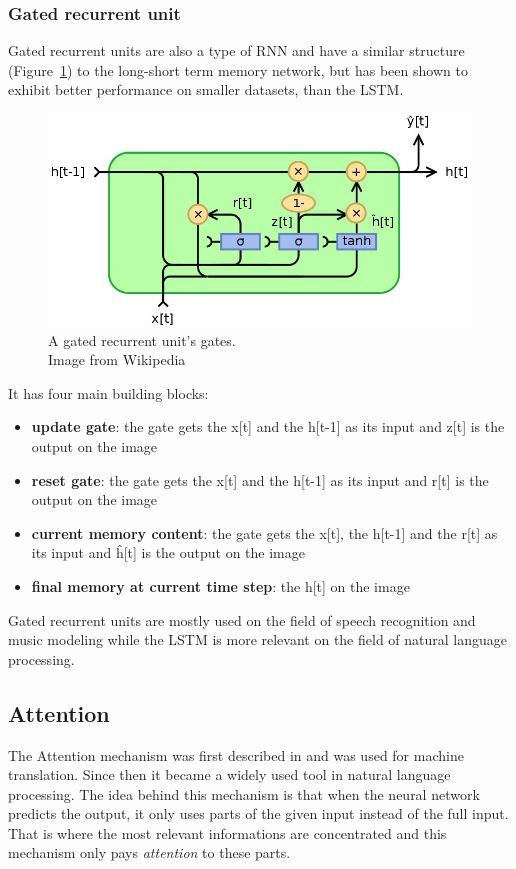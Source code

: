\subsubsection{Gated recurrent unit}
Gated recurrent units are also a type of RNN and have a similar structure (Figure~\ref{fig:gru}) to the long-short term memory network, but has been shown to exhibit better performance on smaller datasets, than the LSTM.
\begin{figure}[!htb]
	\centering
	\includegraphics[scale=0.5]{gru.jpg}
	\caption{A gated recurrent unit's gates.\\Image from Wikipedia}
	\label{fig:gru}
\end{figure}

It has four main building blocks:
\begin{itemize}
	\item \textbf{update gate}: the gate gets the x[t] and the h[t-1] as its input and z[t] is the output on the image
	\item \textbf{reset gate}: the gate gets the x[t] and the h[t-1] as its input and r[t] is the output on the image
	\item \textbf{current memory content}: the gate gets the x[t], the h[t-1] and the r[t] as its input and \^{h}[t] is the output on the image
	\item \textbf{final memory at current time step}: the h[t] on the image
\end{itemize}

Gated recurrent units are mostly used on the field of speech recognition and music modeling while the LSTM is more relevant on the field of natural language processing.

\subsection{Attention}
The Attention mechanism was first described in \cite{Bahdanau:2015} and was used for machine translation. Since then it became a widely used tool in natural language processing. The idea behind this mechanism is that when the neural network predicts the output, it only uses parts of the given input instead of the full input. That is where the most relevant informations are concentrated and this mechanism only pays \textit{attention} to these parts.

